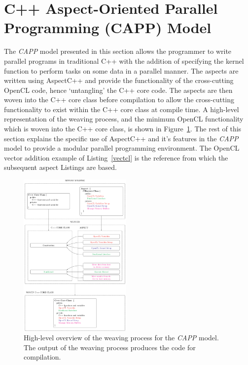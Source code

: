 \documentclass{sig-alternate-05-2015}
\begin{document}
\section{C++ Aspect-Oriented Parallel \\ Programming (CAPP) Model}\label{sec:aspects}

The \textit{CAPP} model presented in this section allows the programmer to
write parallel programs in traditional C++ with the addition of specifying the kernel
function to perform tasks on some data in a parallel manner. The aspects
are written using AspectC++ and provide the functionality of the
cross-cutting OpenCL code, hence `untangling' the C++ core code. The aspects
are then woven into the C++ core class before compilation to allow the cross-cutting
functionality to exist within the C++ core class at compile time. A high-level
representation of the weaving process, and the minimum OpenCL functionality which is
woven into the C++ core class, is shown in Figure~\ref{fig:weaving}. 
The rest of this section explains the specific use of AspectC++ and it's
features in the \textit{CAPP} model to provide a modular parallel programming
environment. The OpenCL vector addition example of Listing~\ref{vectcl} is the
reference from which the subsequent aspect Listings are based.
\begin{figure}[!t]
	\centering
	\includegraphics[width=0.49\textwidth]{weaving}
	\caption{High-level overview of the weaving process for the \textit{CAPP}
		model. The output of the weaving process produces the code for
	compilation.}
	\label{fig:weaving}
\end{figure}
\end{document}

